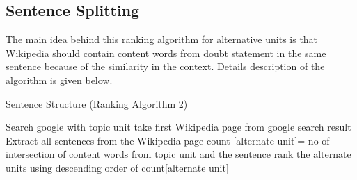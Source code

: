 \documentclass[12pt]{article}
\begin{document}
%
%
%
%
%
%
%


\subsection{Sentence Splitting}

The main idea behind this ranking algorithm for alternative units is that Wikipedia should contain content words from doubt statement in the same sentence because of the similarity in the context. Details description of the algorithm is given below.


\begin{algorithm}
\small
\caption{Sentence Structure (Ranking Algorithm 2)}
\label{alg:SentenceStructure} 
\begin{algorithmic}
\STATE Search google with topic unit
\STATE take first Wikipedia page from google search result
\STATE Extract all sentences from the Wikipedia page
			\STATE count [alternate unit]= no of intersection of content words from topic unit and the sentence
		\ENDIF
	\ENDFOR
\ENDFOR		
\STATE rank the alternate units using descending order of count[alternate unit]

\end{algorithmic}
\end{algorithm}
\end{document}
